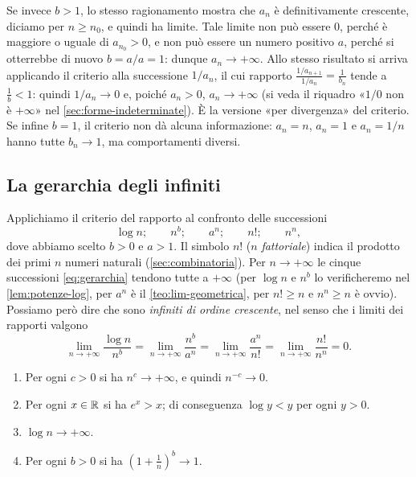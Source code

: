 \begin{osservazione}
Se invece $b>1$, lo stesso ragionamento mostra che $a_{n}$ è definitivamente crescente,
diciamo per $n\ge n_{0}$, e quindi ha limite. Tale limite non può essere $0$, perché è
maggiore o uguale di $a_{n_{0}}>0$, e non può essere un numero positivo $a$, perché si
otterrebbe di nuovo $b=a/a=1$: dunque $a_{n}\to+\infty$. Allo stesso risultato si arriva
applicando il criterio alla successione $1/a_{n}$, il cui rapporto
$\frac{1/a_{n+1}}{1/a_{n}}=\frac1{b_{n}}$ tende a $\frac1b<1$: quindi $1/a_{n}\to0$ e,
poiché $a_{n}>0$, $a_{n}\to+\infty$ (si veda il riquadro «$1/0$ non è $+\infty$» nel
\cref{sec:forme-indeterminate}). È la versione «per divergenza» del criterio. Se infine $b=1$, il criterio non dà alcuna
informazione: $a_{n}=n$, $a_{n}=1$ e $a_{n}=1/n$ hanno tutte $b_{n}\to1$, ma
comportamenti diversi.
\end{osservazione}

\subsection{La gerarchia degli infiniti}

Applichiamo il criterio del rapporto al confronto delle successioni
\begin{equation}\label{eq:gerarchia}
  \log n; \qquad n^{b}; \qquad a^{n}; \qquad n!; \qquad n^{n},
\end{equation}
dove abbiamo scelto $b>0$ e $a>1$. Il simbolo $n!$ ($n$ \emph{fattoriale}) indica il
prodotto dei primi $n$ numeri naturali (\cref{sec:combinatoria}). Per $n\to+\infty$ le
cinque successioni \eqref{eq:gerarchia} tendono tutte a $+\infty$ (per $\log n$ e
$n^{b}$ lo verificheremo nel \cref{lem:potenze-log}, per $a^{n}$ è il
\cref{teo:lim-geometrica}, per $n!\ge n$ e $n^{n}\ge n$ è ovvio). Possiamo però dire che
sono \emph{infiniti di ordine crescente}, nel senso
che i limiti dei rapporti valgono
\begin{equation}\label{eq:gerarchia-limiti}
  \lim_{n\to+\infty}\frac{\log n}{n^{b}}=\lim_{n\to+\infty}\frac{n^{b}}{a^{n}}
  =\lim_{n\to+\infty}\frac{a^{n}}{n!}=\lim_{n\to+\infty}\frac{n!}{n^{n}}=0 .
\end{equation}

\begin{lemma}\label{lem:potenze-log}
\leavevmode
\begin{enumerate}
  \item Per ogni $c>0$ si ha $n^{c}\to+\infty$, e quindi $n^{-c}\to0$.
  \item Per ogni $x\in\mathbb{R}$ si ha $e^{x}>x$; di conseguenza $\log y<y$ per ogni $y>0$.
  \item $\log n\to+\infty$.
  \item Per ogni $b>0$ si ha $(1+\frac1n)^{b}\to1$.
\end{enumerate}
\end{lemma}

